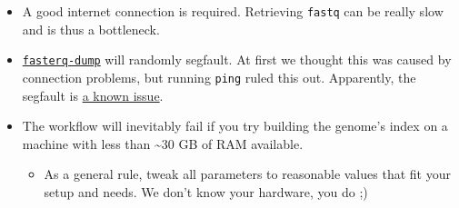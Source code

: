 \documentclass[
  openany]{book}
\providecommand{\tightlist}{%
  \setlength{\itemsep}{0pt}\setlength{\parskip}{0pt}}
\begin{document}
\begin{itemize}
\tightlist
\item
  A good internet connection is required. Retrieving \texttt{fastq} can be really slow and is thus a bottleneck.
\item
  \href{https://github.com/ncbi/sra-tools/wiki}{\texttt{fasterq-dump}} will randomly segfault.
  At first we thought this was caused by connection problems, but running \texttt{ping} ruled this out. Apparently, the segfault is \href{https://github.com/ncbi/sra-tools/issues/518}{a known issue}.
\item
  The workflow will inevitably fail if you try building the genome's index on a machine with less than \textasciitilde30 GB of RAM available.

  \begin{itemize}
  \tightlist
  \item
    As a general rule, tweak all parameters to reasonable values that fit your setup and needs. We don't know your hardware, you do ;)
  \end{itemize}
\end{itemize}

  
\end{document}
